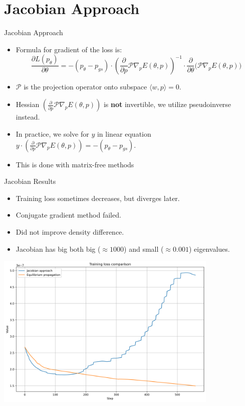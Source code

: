 \documentclass{beamer}
\begin{document}
\section{Jacobian Approach}
\begin{frame}{Jacobian Approach}
  \begin{itemize}
    \item Formula for gradient of the loss is:
    \[
      \frac{\partial L(p_{\theta})}{\partial \theta} = -(p_{\theta}-p_{gs}) \cdot \left(\frac{\partial}{\partial p}\mathcal{P}\nabla_p E(\theta, p)\right)^{-1} \cdot \frac{\partial}{\partial \theta}\big(\mathcal{P}\nabla_p E(\theta, p)\big)
    \]
    \item  $\mathcal{P}$ is the projection operator onto subspace $\langle w,p \rangle = 0$.
    \item Hessian $\left(\frac{\partial}{\partial p}\mathcal{P}\nabla_p E(\theta, p)\right)$ is \textbf{not} invertible, we utilize pseudoinverse instead.
    \item In practice, we solve for $y$ in linear equation $ y \cdot \left(\frac{\partial}{\partial p}\mathcal{P}\nabla_p E(\theta, p)\right) = -(p_{\theta}-p_{gs})$.
    \item This is done with matrix-free methods
  \end{itemize}
\end{frame}

\begin{frame}{Jacobian Results}
  \begin{itemize}
    \item Training loss sometimes decreases, but diverges later.
    \item Conjugate gradient method failed.
    \item Did not improve density difference.
    \item Jacobian has big both big ($\approx 1000$) and small ($\approx 0.001$) eigenvalues.
  \end{itemize}
\end{frame}

\begin{frame}
 \begin{center}
    \includegraphics[width=0.8\textwidth]{images/loss_comparison.png} %
  \end{center}
\end{frame}
\end{document}
